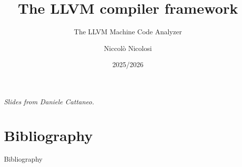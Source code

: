 

\author{Niccolò Nicolosi}
\date{2025/2026}
\title{The LLVM compiler framework}
\subtitle{The LLVM Machine Code Analyzer}
\newcommand{\customdata}{Niccolò Nicolosi}





\begin{frame}
\maketitle
\begin{center}
\itshape\scriptsize
Slides from Daniele Cattaneo.
\end{center}
\end{frame}









\section{Bibliography}
\begin{frame}[allowframebreaks]{Bibliography}
\nocite{*}


\end{frame}


